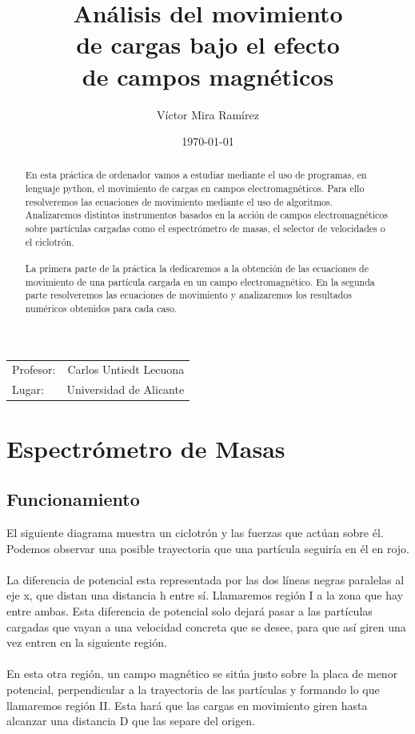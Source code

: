 \documentclass{article}
\title{\textbf{Análisis del movimiento \\ de cargas bajo el efecto \\ de campos magnéticos}}
\author{Víctor Mira Ramírez}
\date{\today}
\begin{document}
\maketitle

\begin{center}
\begin{tabular}{l r}

Profesor: & Carlos Untiedt Lecuona\\
Lugar: & Universidad de Alicante
\end{tabular}
\end{center}

\tableofcontents

\begin{abstract}
    \noindent En esta práctica de ordenador vamos a estudiar mediante el
    uso de programas, en lenguaje python, el movimiento de cargas en
    campos electromagnéticos. Para ello resolveremos las ecuaciones
    de movimiento mediante el uso de algoritmos. Analizaremos
    distintos instrumentos basados en la acción de campos
    electromagnéticos sobre partículas cargadas como el espectrómetro
    de masas, el selector de velocidades o el ciclotrón. 
    \\ \\La primera parte de la práctica la dedicaremos a la obtención de las
    ecuaciones de movimiento de una partícula cargada en un campo
    electromagnético. En la segunda parte resolveremos las
    ecuaciones de movimiento y analizaremos los resultados numéricos
    obtenidos para cada caso.
\end{abstract}
    
\newpage
    
\section{Espectrómetro de Masas}
    \subsection{Funcionamiento}
    El siguiente diagrama muestra un ciclotrón y las fuerzas que actúan sobre él. Podemos observar una posible trayectoria que una partícula seguiría en él en rojo.
    \\ \\ La diferencia de potencial esta representada por las dos líneas negras paralelas al eje x, que distan una distancia h entre sí. Llamaremos región I a la zona que hay entre ambas. Esta diferencia de potencial solo dejará pasar a las partículas cargadas que vayan a una velocidad concreta que se desee, para que así giren una vez entren en la siguiente región.
    \\ \\ En esta otra región, un campo magnético se sitúa justo sobre la placa de menor potencial, perpendicular a la trayectoria de las partículas y formando lo que llamaremos región II. Esta hará que las cargas en movimiento giren hasta alcanzar una distancia D que las separe del origen.
    
\end{document}
